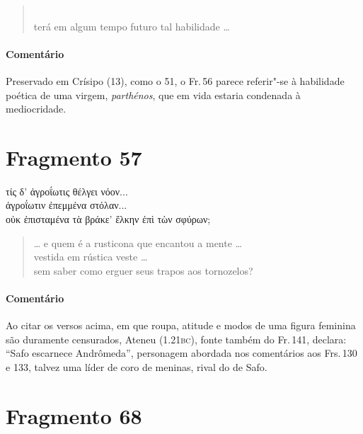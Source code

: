 \begin{verse}
\\
terá em algum tempo futuro tal habilidade \ldots{}
\end{verse}

\medskip

{\paragraph{Comentário} Preservado em Crísipo (13), como o 51, o Fr.\,56 parece referir"-se à habilidade
poética de uma virgem, \emph{parthénos}, que em vida estaria condenada à
mediocridade.}


\section{Fragmento 57}

\begin{gkverse}
τίς δ’ ἀγροΐωτις θέλγει νόον...\\
ἀγροΐωτιν ἐπεμμένα στόλαν...\\
οὐκ ἐπισταμένα τὰ βράκε’ ἔλκην ἐπὶ τὼν σφύρων;
\end{gkverse}

\begin{verse}
\ldots{} e quem é a rusticona que encantou a mente \ldots{}\\
vestida em rústica veste \ldots{}\\
sem saber como erguer seus trapos aos tornozelos?
\end{verse}

\medskip

{\paragraph{Comentário} Ao citar os versos acima, em que roupa, atitude e modos de uma figura feminina são
duramente censurados, Ateneu (1.21\textsc{bc}), fonte também do Fr.\,141, declara: ``Safo
escarnece Andrômeda'', personagem abordada nos comentários aos Frs.\,130 e 133, talvez uma líder de coro de meninas, rival do de Safo.}

\section{Fragmento 68} 

